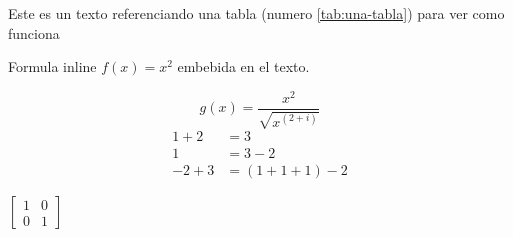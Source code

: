 \documentclass[a4paper,12pt]{article}
\begin{document}
Este es un texto referenciando una tabla (numero \ref{tab:una-tabla}) para ver como funciona
	
Formula inline $f(x) = x^2$ embebida en el texto.	


	\begin{equation*}
		g(x) = \frac{x^2}{\sqrt{x^{(2+i)}}} 
	\end{equation*}
%
	\begin{align*}
		1 + 2 &= 3\\
		1 &= 3 - 2\\
		-2 + 3 &= (1+1+1) - 2
	\end{align*}
	
	$
	\left[	
	\begin{matrix}
		1 & 0\\
		0 & 1
	\end{matrix}
	\right]
	$
	
	
\end{document}
